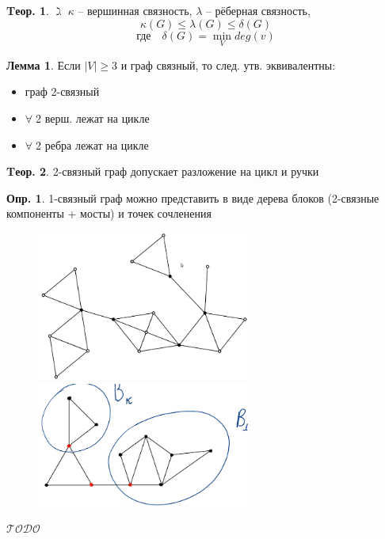 \documentclass[a4paper,12pt]{article}
\numberwithin{figure}{section}
\theoremstyle{definition}
\newtheorem{definition}{Опр.}[section]
\theoremstyle{definition}
\newtheorem{theorem}{Tеор.}[section]
\newtheorem{lemma}{Лемма}[section]
\def\ilet{$\gimel\;$}
\def\iiany{$\forall\;$}
\def\iiTODO{\guillemotleft$\mathcal{TODO}$\guillemotright\textellipsis}
\begin{document}
\begin{theorem}
	\ilet $\kappa$ -- вершинная связность, $\lambda$ -- рёберная связность,
	\[ \kappa(G) \leqslant \lambda(G) \leqslant \delta(G) \]
	\[ \text{где} \quad \delta(G) = \min_V deg(v) \]
\end{theorem}

\begin{lemma}
	Если $|V| \geqslant 3$ и граф связный, то след. утв. эквивалентны:
	\begin{itemize}
		\item  граф 2-связный
		\item  \iiany 2 верш. лежат на цикле
		\item  \iiany 2 ребра лежат на цикле
	\end{itemize}
\end{lemma}

\begin{theorem}
	2-связный граф допускает разложение на цикл и ручки
\end{theorem}

\begin{definition}
	1-связный граф можно представить в виде дерева блоков (2-связные компоненты + мосты) и точек сочленения
\end{definition}
\begin{figure}[H]
	\centering
	\includegraphics[width=7cm]{1conn-tree-of-blocks-and-junctons-fig1.png}
	\includegraphics[width=7cm]{1conn-tree-of-blocks-and-junctons-fig2.png}
\end{figure}


\iiTODO
\end{document}
